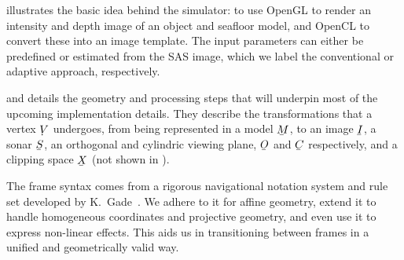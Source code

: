  illustrates the basic idea behind the simulator: to use OpenGL to render an intensity and depth image of an object and seafloor model, and OpenCL to convert these into an image template. The input parameters can either be predefined or estimated from the SAS image, which we label the conventional or adaptive approach, respectively.

 and  details the geometry and processing steps that will underpin most of the upcoming implementation details. They describe the transformations that a vertex $\udot{V}$ undergoes, from being represented in a model $\ubar{M}$, to an image $\ubar{I}$, a sonar $\ubar{S}$, an orthogonal and cylindric viewing plane, $\ubar{O}$ and $\ubar{C}$ respectively, and a clipping space $\ubar{X}$ (not shown in ).   

The frame syntax comes from a rigorous navigational notation system and rule set developed by K.~Gade~\cite{Gade2018}. We adhere to it for affine geometry, extend it to handle homogeneous coordinates and projective geometry, and even use it to express non-linear effects. This aids us in transitioning between frames in a unified and geometrically valid way.



